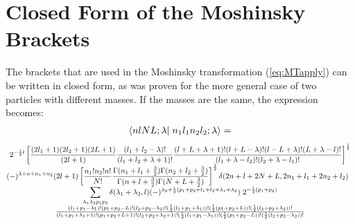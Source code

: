 \chapter{Closed Form of the Moshinsky Brackets\label{app:MTCF}}
The brackets that are used in the Moshinsky transformation 
(\ref{eq:MTapply}) can be written in closed form, as was proven 
for the more general case of two particles with different masses\cite{SG72}.
If the  masses are the same, the expression becomes:
%
	\begin{eqnarray}
	\label{eq:MTCF}
		\inp< n l N L; \lambda | n_1 l_1 n_2 l_2; \lambda > 
	=
	\end{eqnarray}
%
{ 
\renewcommand{\arraystretch}{1.5}
\tiny
%
	\begin{eqnarray}
	\begin{array}{c}
	{
	\displaystyle
		2^{-\frac{1}{2} l}
		\left[
		\frac{ (2l_1+1)(2l_2+1)(2L+1)} {(2l+1)}	
		\frac{ (l_1+l_2-\lambda)!}{(l_1+l_2+\lambda+1)!} 
		\frac{ (l+L+\lambda+1)!
		       (l+L-\lambda)!
		       (l-L+\lambda)!
		       (L+\lambda-l)!
                     }{(l_1+\lambda-l_2)! 
                       (l_2+\lambda-l_1)!} 
		\right]^\frac{1}{2}
	}
	\\
	{
	\displaystyle
		\hspace{-7pt}
		(-)^{\lambda+n+n_1+n_2}
		(2l+1)
		\left[
		\frac{ n_1! n_2! n!} {N!}	
		\frac{ 
			\Gamma( n_1+l_1 + \frac{3}{2} )
			\Gamma( n_2+l_2 + \frac{3}{2} )
		     } 
		     {
			\Gamma( n+l + \frac{3}{2} )
			\Gamma( N+L + \frac{3}{2} )
		     }	
		\right]^\frac{1}{2}
		\delta ( 2n+l+2N+L, 2n_1+l_1+2n_2+l_2 )
	}
	\\
	{
	\displaystyle
		\sum_{ \lambda_1 \lambda_2 p_1 p_2 }
		\delta( \lambda_1+\lambda_2, l)
		(-)^{\lambda_2 + 
		     \frac{1}{2}( p_1+p_2+l_1+l_2+\lambda_1+\lambda_2} )
		\;
		2^{-\frac{1}{2}(p_1+p_2)}
	}
	\\
	{
		\frac{
			(l_1+p_1-\lambda_1)!
			(p_1+p_2-L)!
			(l_2+p_2-\lambda_2)!
			(\frac{1}{2}(l_1+p_1+\lambda_1))!
			(\frac{1}{2}(p_1+p_2+L))!
			(\frac{1}{2}(l_2+p_2+\lambda_2))!
		     }
		     {
			(l_1+p_1+\lambda_1+1)!
			(p_1+p_2+L+1)!
			(l_2+p_2+\lambda_2+1)!
			(\frac{1}{2}(l_1+p_1-\lambda_1))!
			(\frac{1}{2}(p_1+p_2-L))!
			(\frac{1}{2}(l_2+p_2-\lambda_2))!
		     }
	}
	\\[5pt]
	{
	\displaystyle
	\hspace{-7pt}
}
\end{array}
\end{eqnarray}}
